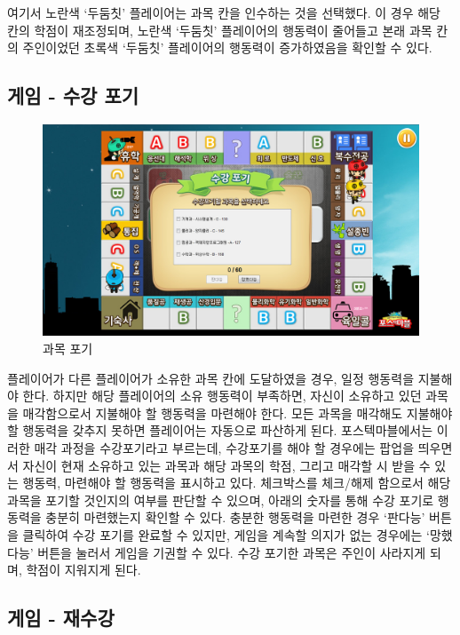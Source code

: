 \documentclass[10pt,oneside,a4paper,titlepage]{article}
\begin{document}
 
여기서 노란색 ‘두둠칫’ 플레이어는 과목 칸을 인수하는 것을 선택했다. 이 경우 해당 칸의 학점이 재조정되며, 노란색 ‘두둠칫’ 플레이어의 행동력이 줄어들고 본래 과목 칸의 주인이었던 초록색 ‘두둠칫’ 플레이어의 행동력이 증가하였음을 확인할 수 있다.
 
\subsection{게임 - 수강 포기}

\begin{figure}[H]
\centering
\centerline{\includegraphics[scale=0.65]{images/6drop}}
\caption{과목 포기}
\end{figure}


 플레이어가 다른 플레이어가 소유한 과목 칸에 도달하였을 경우, 일정 행동력을 지불해야 한다. 하지만 해당 플레이어의 소유 행동력이 부족하면, 자신이 소유하고 있던 과목을 매각함으로서 지불해야 할 행동력을 마련해야 한다. 모든 과목을 매각해도 지불해야 할 행동력을 갖추지 못하면 플레이어는 자동으로 파산하게 된다. 포스텍마블에서는 이러한 매각 과정을 수강포기라고 부르는데, 수강포기를 해야 할 경우에는 팝업을 띄우면서 자신이 현재 소유하고 있는 과목과 해당 과목의 학점, 그리고 매각할 시 받을 수 있는 행동력, 마련해야 할 행동력을 표시하고 있다. 체크박스를 체크/해제 함으로서 해당 과목을 포기할 것인지의 여부를 판단할 수 있으며, 아래의 숫자를 통해 수강 포기로 행동력을 충분히 마련했는지 확인할 수 있다. 충분한 행동력을 마련한 경우 ‘판다능’ 버튼을 클릭하여 수강 포기를 완료할 수 있지만, 게임을 계속할 의지가 없는 경우에는 ‘망했다능’ 버튼을 눌러서 게임을 기권할 수 있다. 수강 포기한 과목은 주인이 사라지게 되며, 학점이 지워지게 된다.
 
\subsection{게임 - 재수강}
\end{document}
